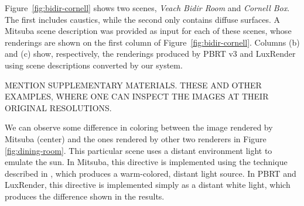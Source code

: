 Figure~\ref{fig:bidir-cornell} shows two scenes, \textit{Veach Bidir Room} and \textit{Cornell Box}. The first includes caustics, while the second only contains diffuse surfaces. A Mitsuba scene description was provided as input for each of these scenes, whose renderings are shown on the first column of Figure~\ref{fig:bidir-cornell}. Columns (b) and (c) show, respectively, the renderings produced by PBRT v3 and LuxRender using scene descriptions converted by our system.    

MENTION SUPPLEMENTARY MATERIALS. THESE AND OTHER EXAMPLES, WHERE ONE CAN INSPECT THE IMAGES AT THEIR ORIGINAL RESOLUTIONS.



We can observe some difference in coloring between the image rendered by Mitsuba 
(center) and the ones rendered by other two renderers in Figure 
\ref{fig:dining-room}. This particular scene uses a distant environment light to 
emulate the sun. In Mitsuba, this directive is implemented using the technique 
described in \cite{Preetham}, which produces a warm-colored, distant light source. In 
PBRT and LuxRender, this directive is implemented simply as a distant white 
light, which produces the difference shown in the results.


